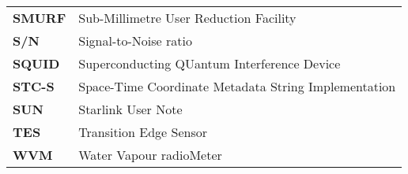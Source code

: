 \documentclass[11pt,oneside,chapters]{starlink}
\begin{document}
\begin{table}[h!]
\begin{tabular}{ll}
\textbf{SMURF}  & Sub-Millimetre User Reduction Facility\\
\textbf{S/N}    & Signal-to-Noise ratio\\
\textbf{SQUID}  & Superconducting QUantum Interference Device\\
\textbf{STC-S}  & Space-Time Coordinate Metadata String Implementation\\
\textbf{SUN}    & Starlink User Note\\
\textbf{TES}    & Transition Edge Sensor\\
\textbf{WVM}    & Water Vapour radioMeter\\
\end{tabular}
\end{table}


\newpage

\newpage

\newpage

\newpage

\newpage

\newpage

\newpage
\end{document}
